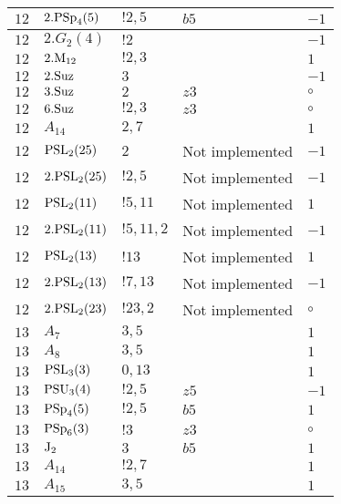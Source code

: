\documentclass[a4paper, 11pt]{article}
\begin{document}
\begin{longtable}{lllll}
        $ 12 $ & $ 2.{\rm PSp}_{4}(5) $ & $ ! 2,5 $ & $ b5 $ & $ -1$ \\ \hline
        $ 12 $ & $ 2.G_{2}(4) $ & $ ! 2 $ & $ ~ $ & $ -1$ \\ \hline
        $ 12 $ & $ 2.{\rm M}_{12} $ & $ ! 2,3 $ & $ ~ $ & $ 1$ \\ \hline
        $ 12 $ & $ 2.{\rm Suz} $ & $ 3 $ & $ ~ $ & $ -1$ \\ \hline
        $ 12 $ & $ 3.{\rm Suz} $ & $ 2 $ & $ z3 $ &  $\circ$ \\ \hline
        $ 12 $ & $ 6.{\rm Suz} $ & $ ! 2,3 $ & $ z3 $ &  $\circ$ \\ \hline
        $ 12 $ & $ A_{14} $ & $ 2, 7 $ & $ ~ $ & $ 1$ \\ \hline
        $ 12 $ & $ {\rm PSL}_{2}(25) $ & $ 2 $ &  Not implemented & $ -1$ \\ \hline
        $ 12 $ & $ 2.{\rm PSL}_{2}(25) $ & $ !2, 5 $ &  Not implemented & $ -1$ \\ \hline
        $ 12 $ & $ {\rm PSL}_{2}(11) $ & $ !5, 11 $ &  Not implemented & $ 1$ \\ \hline
        $ 12 $ & $ 2.{\rm PSL}_{2}(11) $ & $ !5, 11, 2 $ &  Not implemented & $ -1$ \\ \hline
        $ 12 $ & $ {\rm PSL}_{2}(13) $ & $ !13 $ &  Not implemented & $ 1$ \\ \hline
        $ 12 $ & $ 2.{\rm PSL}_{2}(13) $ & $ !7, 13 $ &  Not implemented & $ -1$ \\ \hline
        $ 12 $ & $ 2.{\rm PSL}_{2}(23) $ & $ !23, 2 $ &  Not implemented &  $\circ$ \\ \hline
        $ 13 $ & $ A_{7} $ & $ 3,5 $ & $ ~ $ & $ 1$ \\ \hline
        $ 13 $ & $ A_{8} $ & $ 3,5 $ & $ ~ $ & $ 1$ \\ \hline
        $ 13 $ & $ {\rm PSL}_{3}(3) $ & $ 0,13 $ & $ ~ $ & $ 1$ \\ \hline
        $ 13 $ & $ {\rm PSU}_{3}(4) $ & $ ! 2,5 $ & $ z5 $ & $ -1$ \\ \hline
        $ 13 $ & $ {\rm PSp}_{4}(5) $ & $ ! 2,5 $ & $ b5 $ & $ 1$ \\ \hline
        $ 13 $ & $ {\rm PSp}_{6}(3) $ & $ ! 3 $ & $ z3 $ &  $\circ$ \\ \hline
        $ 13 $ & $ {\rm J}_2 $ & $ 3 $ & $ b5 $ & $ 1$ \\ \hline
        $ 13 $ & $ A_{14} $ & $ !2, 7 $ & $ ~ $ & $ 1$ \\ \hline
        $ 13 $ & $ A_{15} $ & $ 3, 5 $ & $ ~ $ & $ 1$ \\ \hline

\end{longtable}
\end{document}
